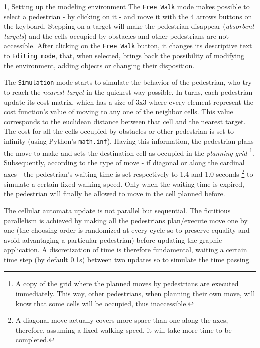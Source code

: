 \documentclass[10pt,a4paper]{article}
\begin{document}
\begin{task}{1, Setting up the modeling environment}
The \texttt{Free Walk} mode makes possible to select a pedestrian - by clicking on it - and move it with the 4 arrows buttons on the keyboard.
Stepping on a target will make the pedestrian disappear (\textit{absorbent targets}) and the cells occupied by obstacles and other pedestrians are not accessible.
After clicking on the \texttt{Free Walk} button, it changes its descriptive text to \texttt{Editing mode}, that, when selected, brings back the possibility of modifying the environment, adding objects or changing their disposition.

The \texttt{Simulation} mode starts to simulate the behavior of the pedestrian, who try to reach the \textit{nearest target} in the quickest way possible.
In turns, each pedestrian update its cost matrix, which has a size of 3x3 where every element represent the cost function's value of moving to any one of the neighbor cells.
This value corresponds to the euclidean distance between that cell and the nearest target.
The cost for all the cells occupied by obstacles or other pedestrian is set to infinity (using Python's \texttt{math.inf}).
Having this information, the pedestrian plans the move to make and sets the destination cell as occupied in the \textit{planning grid}
\footnote{A copy of the grid where the planned moves by pedestrians are executed immediately. This way, other pedestrians, when planning their own move, will know that some cells will be occupied, thus inaccessible.}.
Subsequently, according to the type of move - if diagonal or along the cardinal axes - the pedestrian's waiting time is set respectively to 1.4 and 1.0 seconds
\footnote{A diagonal move actually covers more space than one along the axes, therefore, assuming a fixed walking speed, it will take more time to be completed.}
to simulate a certain fixed walking speed.
Only when the waiting time is expired, the pedestrian will finally be allowed to move in the cell planned before.

The cellular automata update is not parallel but sequential. The fictitious parallelism is achieved by making all the pedestrians plan/execute move one by one (the choosing order is randomized at every cycle so to preserve equality and avoid advantaging a particular pedestrian) before updating the graphic application. A discretization of time is therefore fundamental, waiting a certain time step (by default 0.1s) between two updates so to simulate the time passing.


\end{task}
\end{document}
